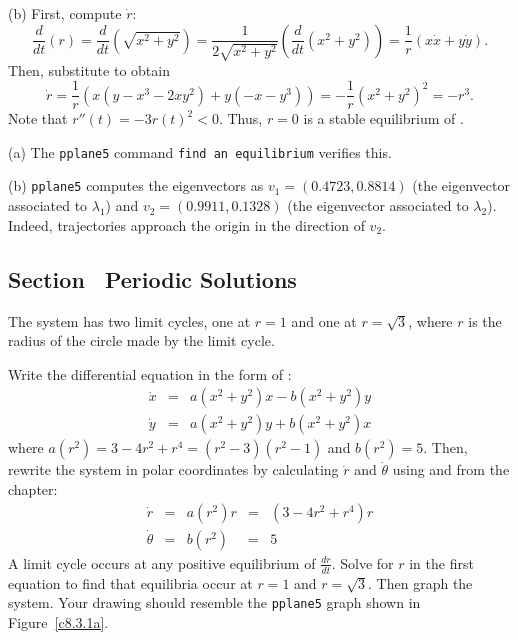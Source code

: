 \documentclass{ximera}
\begin{document}
(b) First, compute $\dot{r}$:
\[
\frac{d}{dt}(r) = \frac{d}{dt}(\sqrt{x^2 + y^2}) =
\frac{1}{2\sqrt{x^2 + y^2}}\left(\frac{d}{dt}(x^2 + y^2)\right)
= \frac{1}{r}(x\dot{x} + y\dot{y}).
\]
Then, substitute  to obtain
\[
\dot{r} = \frac{1}{r}(x(y - x^3 - 2xy^2) + y(-x - y^3))
= -\frac{1}{r}(x^2 + y^2)^2 = -r^3.
\]
Note that $r''(t) = -3r(t)^2 < 0$.  Thus, $r = 0$ is a stable equilibrium
of .

(a) The {\tt pplane5} command {\tt find an equilibrium} verifies this.

(b) {\tt pplane5} computes the eigenvectors as $v_1 = (0.4723,0.8814)$
(the eigenvector associated to $\lambda_1$) and $v_2 =
(0.9911,0.1328)$ (the eigenvector associated to $\lambda_2$).
Indeed, trajectories approach the origin in the direction of $v_2$.



\newpage
\subsection*{Section~\protect{\ref{S:periodic}} Periodic Solutions}

\ans The system has two limit cycles, one at $r = 1$ and one at $r =
\sqrt{3}$, where $r$ is the radius of the circle made by the limit cycle.

\soln Write the differential equation in the form of :
\[ \begin{array}{rcl}
\dot{x} & = & a(x^2 + y^2)x - b(x^2 + y^2)y \\
\dot{y} & = & a(x^2 + y^2)y + b(x^2 + y^2)x \end{array}
\]
where $a(r^2) = 3 - 4r^2 + r^4=(r^2-3)(r^2-1)$ and $b(r^2) = 5$.  Then,
rewrite the system in polar coordinates by calculating $\dot{r}$ and
$\dot{\theta}$ using  and  from the
chapter:
\[ \begin{array}{rcccl}
\dot{r} & = & a(r^2)r & = & (3 - 4r^2 + r^4)r \\
\dot{\theta} & = & b(r^2) & = & 5 \end{array}
\]
A limit cycle occurs at any positive equilibrium of $\frac{dr}{dt}$.
Solve for $r$ in the first equation to find that equilibria occur
at $r = 1$ and $r = \sqrt{3}$.  Then graph the system.  Your drawing
should resemble the {\tt pplane5} graph shown in Figure~\ref{c8.3.1a}.

\begin{figure}[htb]
                       \centerline{%
                       }
\end{figure}
\end{document}

